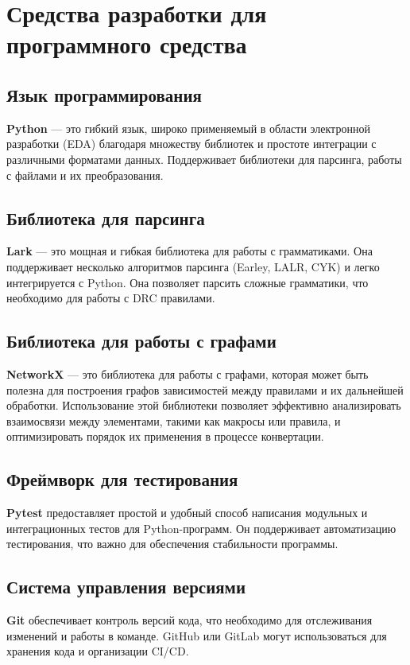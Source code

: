 \section{Средства разработки для программного средства}

\subsection{Язык программирования}
\textbf{Python} --- это гибкий язык,
широко применяемый в области электронной разработки (EDA)
благодаря множеству библиотек
и простоте интеграции с различными форматами данных.
Поддерживает библиотеки для парсинга, работы с файлами и их преобразования.
  
\subsection{Библиотека для парсинга}
\textbf{Lark} --- это мощная и гибкая библиотека
для работы с грамматиками.
Она поддерживает несколько алгоритмов парсинга (Earley, LALR, CYK)
и легко интегрируется с Python.
Она позволяет парсить сложные грамматики,
что необходимо для работы с DRC правилами.

\subsection{Библиотека для работы с графами}
\textbf{NetworkX} --- это библиотека для работы с графами,
которая может быть полезна для построения графов зависимостей между правилами
и их дальнейшей обработки.
Использование этой библиотеки позволяет эффективно анализировать взаимосвязи
между элементами, такими как макросы или правила,
и оптимизировать порядок их применения в процессе конвертации.

\subsection{Фреймворк для тестирования}
\textbf{Pytest} предоставляет простой
и удобный способ написания модульных
и интеграционных тестов для Python-программ.
Он поддерживает автоматизацию тестирования,
что важно для обеспечения стабильности программы.

\subsection{Система управления версиями}
\textbf{Git} обеспечивает контроль версий кода,
что необходимо для отслеживания изменений и работы в команде.
GitHub или GitLab могут использоваться для хранения кода и организации CI/CD.

